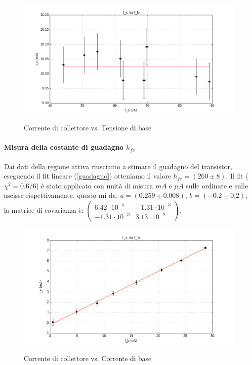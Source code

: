 \documentclass[10pt,a4paper]{article}
\begin{document}
\begin{figure}[!htb]
  \centering
  \includegraphics[scale=0.4]{fitSaturazione.png} \label{saturazione}
\caption{Corrente di collettore vs. Tensione di base}
\label{circuito}
\end{figure}


\paragraph{Misura della costante di guadagno $h_{fe}$}
Dai dati della regione attiva riusciamo a stimare il guadagno del transistor, eseguendo il fit lineare (\ref{guadagno}) otteniamo il valore $h_{fe} = (260 \pm 8)$. Il fit ($\chi^2 = 0.6/6$) è stato applicato con unità di misura $mA$ e $\mu A$ sulle ordinate e sulle ascisse rispettivamente, questo mi da:
$a = (0.259 \pm 0.008)$, $b = (-0.2 \pm 0.2)$, la matrice di covarianza è: $\left(
\begin{array}{cc}
6.42 \cdot 10^{-5} & -1.31 \cdot 10^{-3} \\ 
-1.31 \cdot 10^{-3} & 3.13 \cdot 10^{-2}
\end{array}   
\right)$.

\begin{figure}[!htb]
  \centering
  \includegraphics[scale=0.4]{rettaGuadagno.png} \label{guadagno}
\caption{Corrente di collettore vs. Corrente di base}
\label{circuito}
\end{figure}
\end{document}
